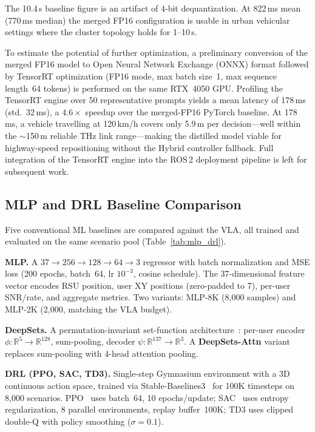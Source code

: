\documentclass[journal]{IEEEtran}
\begin{document}
The 10.4\,s baseline figure is an artifact of 4-bit dequantization. At 822\,ms mean (770\,ms median) the merged FP16 configuration is usable in urban vehicular settings where the cluster topology holds for 1--10\,s.

To estimate the potential of further optimization, a preliminary conversion of the merged FP16 model to Open Neural Network Exchange (ONNX) format followed by TensorRT optimization (FP16 mode, max batch size~1, max sequence length~64 tokens) is performed on the same RTX~4050 GPU. Profiling the TensorRT engine over 50 representative prompts yields a mean latency of 178\,ms (std.~32\,ms), a $4.6\times$ speedup over the merged-FP16 PyTorch baseline. At 178\,ms, a vehicle travelling at 120\,km/h covers only 5.9\,m per decision---well within the ${\sim}$150\,m reliable THz link range---making the distilled model viable for highway-speed repositioning without the Hybrid controller fallback. Full integration of the TensorRT engine into the ROS\,2 deployment pipeline is left for subsequent work.


\subsection{MLP and DRL Baseline Comparison}
\label{sec:mlp_drl}

Five conventional ML baselines are compared against the VLA, all trained and evaluated on the same scenario pool (Table~\ref{tab:mlp_drl}).

\textbf{MLP.} A $37 \to 256 \to 128 \to 64 \to 3$ regressor with batch normalization and MSE loss (200 epochs, batch~64, lr $10^{-3}$, cosine schedule). The 37-dimensional feature vector encodes RSU position, user XY positions (zero-padded to 7), per-user SNR/rate, and aggregate metrics. Two variants: MLP-8K (8{,}000 samples) and MLP-2K (2{,}000, matching the VLA budget).

\textbf{DeepSets.} A permutation-invariant set-function architecture~\cite{zaheer2017deepsets}: per-user encoder $\phi: \mathbb{R}^5 \to \mathbb{R}^{128}$, sum-pooling, decoder $\psi: \mathbb{R}^{137} \to \mathbb{R}^3$. A \textbf{DeepSets-Attn} variant replaces sum-pooling with 4-head attention pooling.

\textbf{DRL (PPO, SAC, TD3).} Single-step Gymnasium environment with a 3D continuous action space, trained via Stable-Baselines3~\cite{raffin2021sb3} for 100K timesteps on 8{,}000 scenarios. PPO~\cite{schulman2017ppo} uses batch~64, 10 epochs/update; SAC~\cite{haarnoja2018sac} uses entropy regularization, 8 parallel environments, replay buffer~100K; TD3 uses clipped double-Q with policy smoothing ($\sigma{=}0.1$).
\end{document}
